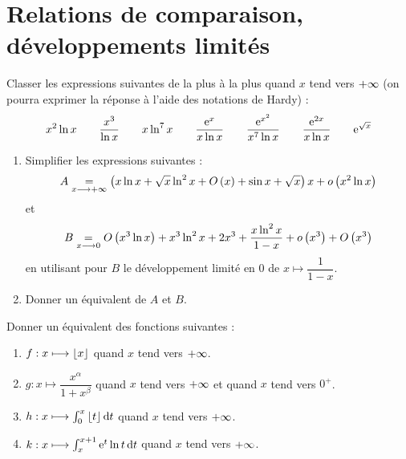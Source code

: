\chapter{Relations de comparaison, développements limités}

\minitoc

\begin{exo}[Exercice 1]
Classer les expressions suivantes de la plus  à la plus  quand \(x\) tend vers \(+\infty\) (on pourra exprimer la réponse à l'aide des notations de Hardy) : \[x^2\ln x\qquad\dfrac{x^3}{\ln x}\qquad x\ln^7x\qquad\dfrac{\mathrm{e}^{x}}{x\ln x}\qquad\dfrac{\mathrm{e}^{x^2}}{x^7\ln x}\qquad\dfrac{\mathrm{e}^{2x}}{x\ln x}\qquad\mathrm{e}^{\sqrt{x}}\]
\end{exo}

\begin{corr}
\end{corr}

\begin{exo}[Exercice 2]
\begin{enumerate}
\item Simplifier les expressions suivantes : \[A\underset{x\longrightarrow+\infty}{=}\left(x\ln x+\sqrt{x}\ln^2x+O\left(x\right)+\sin x+\sqrt{x}\right)x+o\left(x^2\ln x\right)\] et \[B\underset{x\longrightarrow0}{=}O\left(x^3\ln x\right)+x^3\ln^2x+2x^3+\dfrac{x\ln^2x}{1-x}+o\left(x^3\right)+O\left(x^3\right)\] en utilisant pour \(B\) le développement limité en \(0\) de \(x\mapsto\dfrac{1}{1-x}\). \\

\item Donner un équivalent de \(A\) et \(B\).
\end{enumerate}
\end{exo}

\begin{corr}
\end{corr}

\begin{exo}[Exercice 3]
Donner un équivalent des fonctions suivantes :

\begin{enumerate}
\item \(f:x\longmapsto\left\lfloor x\right\rfloor\) quand \(x\) tend vers \(+\infty\). \\

\item \(g:x\mapsto\dfrac{x^{\alpha}}{1+x^{\beta}}\) quand \(x\) tend vers \(+\infty\) et quand \(x\) tend vers \(0^+\). \\

\item \(h:x\mapsto\int_0^x\floor{t}\odif{t}\) quand \(x\) tend vers \(+\infty\). \\

\item \(k:x\mapsto\int_x^{x+1}\e{t}\ln t\odif{t}\) quand \(x\) tend vers \(+\infty\).
\end{enumerate}
\end{exo}

